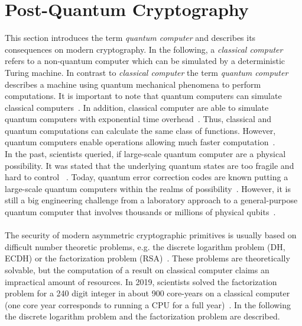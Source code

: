 \section{Post-Quantum Cryptography}
This section introduces the term \textit{quantum computer} and describes its consequences on modern cryptography. In the following, a \textit{classical computer} refers to a non-quantum computer which can be simulated by a deterministic Turing machine. In contrast to \textit{classical computer} the term \textit{quantum computer} describes a machine using quantum mechanical phenomena to perform computations. It is important to note that quantum computers can simulate classical computers~\parencite{nielsen2002quantum}. In addition, classical computer are able to simulate quantum computers with exponential time overhead~\parencite{nielsen2002quantum}. Thus, classical and quantum computations can calculate the same class of functions. However, quantum computers enable operations allowing much faster computation~\parencite{nielsen2002quantum}.\\
In the past, scientists queried, if large-scale quantum computer are a physical possibility. It was stated that the underlying quantum states are too fragile and hard to control~ \parencite{chen2016report}. Today, quantum error correction codes are known putting a large-scale quantum computers within the realms of possibility~\parencite{lidar2013quantum}. However, it is still a big engineering challenge from a laboratory approach to a general-purpose quantum computer that involves thousands or millions of physical qubits~\parencite{chen2016report}.
\\\\
The security of modern asymmetric cryptographic primitives is usually based on difficult number theoretic problems, e.g. the discrete logarithm problem (DH, ECDH) or the factorization problem (RSA)~\parencite{chen2016report}. These problems are theoretically solvable, but the computation of a result on classical computer claims an impractical amount of resources. In 2019, scientists solved the factorization problem for a 240 digit integer in about 900 core-years on a classical computer (one core year corresponds to running a CPU for a full year)~\parencite{boudot2795}. In the following the discrete logarithm problem and the factorization problem are described.

